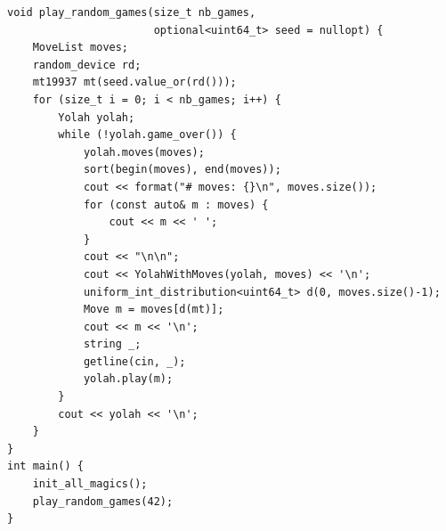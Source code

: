 \documentclass[12pt,a4paper,twoside,openright]{book}
\begin{document}
\begin{mdframed}[skipabove=\baselineskip,hidealllines=true]
\begin{verbatim}
void play_random_games(size_t nb_games, 
                       optional<uint64_t> seed = nullopt) {
    MoveList moves;
    random_device rd;
    mt19937 mt(seed.value_or(rd()));
    for (size_t i = 0; i < nb_games; i++) {
        Yolah yolah;    
        while (!yolah.game_over()) {                 
            yolah.moves(moves);
            sort(begin(moves), end(moves));
            cout << format("# moves: {}\n", moves.size());
            for (const auto& m : moves) {
                cout << m << ' ';
            }            
            cout << "\n\n";
            cout << YolahWithMoves(yolah, moves) << '\n';
            uniform_int_distribution<uint64_t> d(0, moves.size()-1);    
            Move m = moves[d(mt)];
            cout << m << '\n';
            string _;
            getline(cin, _);            
            yolah.play(m);
        }
        cout << yolah << '\n';
    }
}
int main() {
    init_all_magics();
    play_random_games(42);
}
\end{verbatim}
\label{lst:random_games_testing}
\end{mdframed}
\end{document}
